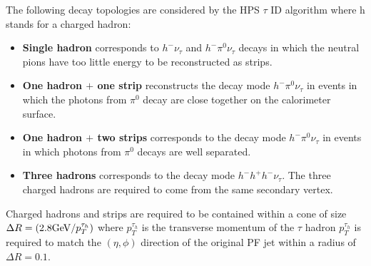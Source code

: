 The following decay topologies are considered by the HPS $\tau$ ID algorithm where
h stands for a charged hadron:
\begin{itemize}
\item{\bf Single hadron}
      corresponds to $ h^{-} \nu_{\tau}$
      and $ h^{-} \pi^{0} \nu_{\tau}$ decays
      in which the neutral pions have too little energy to be reconstructed as strips.
\item{\bf One hadron $+$ one strip}
      reconstructs the decay mode $ h^{-} \pi^{0} \nu_{\tau}$
      in events in which the photons from $\pi^{0}$ decay
      are close together on the calorimeter surface.
\item{\bf One hadron $+$ two strips}
      corresponds to the decay mode $ h^{-} \pi^{0} \nu_{\tau}$
      in events in which photons from $\pi^{0}$ decays are well separated.
\item{\bf Three hadrons}
      corresponds to the decay mode $ h^{-} h^{+} h^{-} \nu_{\tau}$.
      The three charged hadrons are required                                                                                                      
      to come from the same secondary vertex.
\end {itemize}

Charged hadrons and strips are required to be contained within a cone
of size $\Delta R=(2.8\mathrm{GeV}/p_{T}^{\tau_{h}})$ where $p_{T}^{\tau_{h}}$ is 
the transverse momentum of the $\tau$ hadron $p_{T}^{\tau_{h}}$ is 
required to match the $(\eta,\phi)$ direction of the original PF jet within
a radius of $\Delta R=0.1$. 

